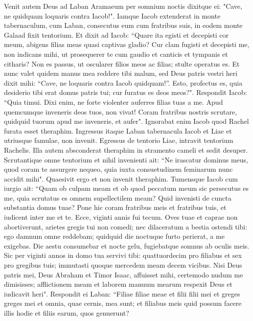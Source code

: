 \begin{biblechapter}
\verse Venit autem Deus ad Laban Aramaeum per somnium noctis dixitque ei: "Cave, ne quidquam loquaris contra Iacob!". 
\verse Iamque Iacob extenderat in monte tabernaculum, cum Laban, consecutus eum cum fratribus suis, in eodem monte Galaad fixit tentorium. 
\verse Et dixit ad Iacob: “Quare ita egisti et decepisti cor meum, abigens filias meas quasi captivas gladio? 
\verse Cur clam fugisti et decepisti me, non indicans mihi, ut prosequerer te cum gaudio et canticis et tympanis et citharis? 
\verse Non es passus, ut oscularer filios meos ac filias; stulte operatus es. Et nunc 
\verse valet quidem manus mea reddere tibi malum, sed Deus patris vestri heri dixit mihi: “Cave, ne loquaris contra Iacob quidquam!”. 
\verse Esto, profectus es, quia desiderio tibi erat domus patris tui; cur furatus es deos meos?". 
\verse Respondit Iacob: “Quia timui. Dixi enim, ne forte violenter auferres filias tuas a me. 
\verse Apud quemcumque inveneris deos tuos, non vivat! Coram fratribus nostris scrutare, quidquid tuorum apud me inveneris, et aufer". Ignorabat enim Iacob quod Rachel furata esset theraphim. 
\verse Ingressus itaque Laban tabernacula Iacob et Liae et utriusque famulae, non invenit. Egressus de tentorio Liae, intravit tentorium Rachelis. 
\verse Illa autem absconderat theraphim in stramento cameli et sedit desuper. Scrutantique omne tentorium et nihil invenienti 
\verse ait: “Ne irascatur dominus meus, quod coram te assurgere nequeo, quia iuxta consuetudinem feminarum nunc accidit mihi". Quaesivit ergo et non invenit theraphim. 
\verse Tumensque Iacob cum iurgio ait: “Quam ob culpam meam et ob quod peccatum meum sic persecutus es me, 
\verse quia scrutatus es omnem supellectilem meam? Quid invenisti de cuncta substantia domus tuae? Pone hic coram fratribus meis et fratribus tuis, et iudicent inter me et te. 
\verse Ecce, viginti annis fui tecum. Oves tuae et caprae non abortiverunt, arietes gregis tui non comedi;  
\verse nec dilaceratum a bestia ostendi tibi: ego damnum omne reddebam; quidquid die noctuque furto perierat, a me exigebas. 
\verse Die aestu consumebar et nocte gelu, fugiebatque somnus ab oculis meis. 
\verse Sic per viginti annos in domo tua servivi tibi: quattuordecim pro filiabus et sex pro gregibus tuis; immutasti quoque mercedem meam decem vicibus. 
\verse Nisi Deus patris mei, Deus Abraham et Timor Isaac, affuisset mihi, certemodo nudum me dimisisses; afflictionem meam et laborem manuum mearum respexit Deus et iudicavit heri". 
\verse Respondit ei Laban: “Filiae filiae meae et filii filii mei et greges greges mei et omnia, quae cernis, mea sunt; et filiabus meis quid possum facere illis hodie et filiis earum, quos genuerunt? 

\end{biblechapter}
